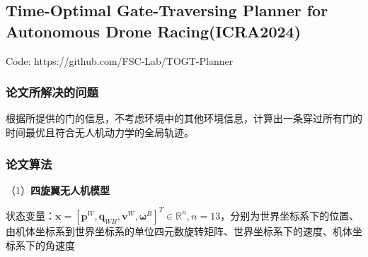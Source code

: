 \subsection{Time-Optimal Gate-Traversing Planner for Autonomous Drone Racing(ICRA2024)}
Code: https://github.com/FSC-Lab/TOGT-Planner
\subsubsection{论文所解决的问题}
根据所提供的门的信息，不考虑环境中的其他环境信息，计算出一条穿过所有门的时间最优且符合无人机动力学的全局轨迹。
\subsubsection{论文算法}
（1）\textbf{四旋翼无人机模型}


状态变量：$\mathbf{x} = [\mathbf{p}^W,\mathbf{q}_{WB},\mathbf{v}^W,\boldsymbol{\omega}^B]^T\in\mathbb{R}^n,n=13$，分别为世界坐标系下的位置、由机体坐标系到世界坐标系的单位四元数旋转矩阵、世界坐标系下的速度、机体坐标系下的角速度\\


